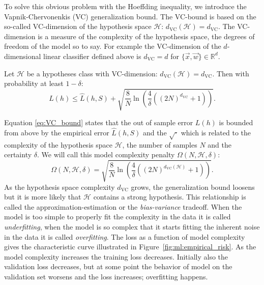 To solve this obvious problem with the Hoeffding inequality, we introduce the Vapnik-Chervonenkis (VC) generalization bound. The VC-bound is based on the so-called VC-dimension of the hypothesis space $\mathcal{H}$: $d_\mathrm{VC}(\mathcal{H}) = d_\mathrm{VC}$. The VC-dimension is a measure of the complexity of the hypothesis space, the degrees of freedom of the model so to say. For example the VC-dimension of the $d$-dimensional linear classifier defined above is $d_\mathrm{VC}=d$ for $\{\vec{x}, \vec{w}\} \in \mathbb{R}^d$. 
\begin{theorem}
  \label{theorem:VC_generalization_bound}
  Let $\mathcal{H}$ be a hypotheses class with VC-dimension: $d_\mathrm{VC}(\mathcal{H}) = d_\mathrm{VC}$. Then with probability at least $1-\delta$: 
  \begin{equation}
    \label{eq:VC_bound}
    L(h) \leq \hat{L}(h, S) + \sqrt{ \frac{8}{N} \ln \left( \frac{4}{\delta} \left( \left(2N \right)^{d_\mathrm{VC}} + 1 \right)  \right)} .
  \end{equation}
\end{theorem}
Equation \eqref{eq:VC_bound} states that the out of sample error $L(h)$ is bounded from above by the empirical error $\hat{L}(h, S)$ and the $\sqrt{ \boldsymbol{\cdot}}$ which is related to the complexity of the hypothesis space $\mathcal{H}$, the number of samples $N$ and the certainty $\delta$. We will call this model complexity penalty $\Omega(N, \mathcal{H}, \delta)$:
\begin{equation}
  \Omega(N, \mathcal{H}, \delta) = \sqrt{ \frac{8}{N} \ln \left( \frac{4}{\delta} \left( \left(2N \right)^{d_\mathrm{VC}(\mathcal{H})} + 1 \right)  \right)}.
\end{equation}
As the hypothesis space complexity $d_\mathrm{VC}$ grows, the generalization bound loosens but it is more likely that $\mathcal{H}$ contains a strong hypothesis. This relationship is called the approximation-estimation or the  \emph{bias-variance} tradeoff. When the model is too simple to properly fit the complexity in the data it is called \emph{underfitting}, when the model is so complex that it starts fitting the inherent noise in the data it is called \emph{overfitting}. The loss as a function of model complexity gives the characteristic curve illustrated in Figure~\ref{fig:ml:empirical_risk}. As the model complexity increases the training loss decreases. Initially also the validation loss decreases, but at some point the behavior of model on the validation set worsens and the loss increases; overfitting happens. 

